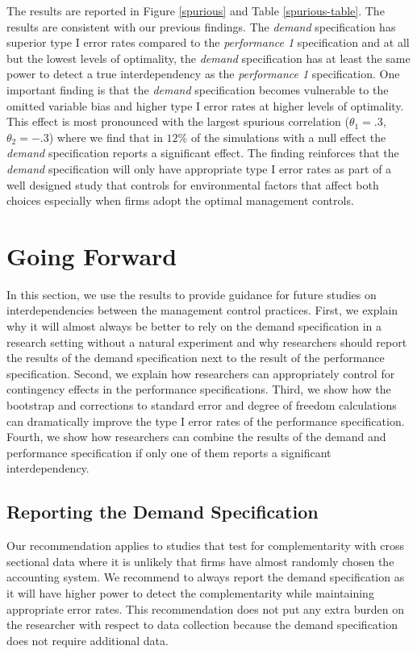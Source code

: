 \documentclass[12pt]{article}
\begin{document}
The results are reported in Figure \ref{spurious} and Table \ref{spurious-table}. The results are consistent with our previous findings. The \emph{demand} specification has superior type I error rates compared to the \emph{performance 1} specification and at all but the lowest levels of optimality, the \emph{demand} specification has at least the same power to detect a true interdependency as the \emph{performance 1} specification. One important finding is that the \emph{demand} specification becomes vulnerable to the omitted variable bias and higher type I error rates at higher levels of optimality. This effect is most pronounced with the largest spurious correlation (\(\theta_1 = .3\), \(\theta_2 = -.3\)) where we find that in $12\%$ of the simulations with a null effect the \emph{demand} specification reports a significant effect. The finding reinforces that the \emph{demand} specification will only have appropriate type I error rates as part of a well designed study that controls for environmental factors that affect both choices especially when firms adopt the optimal management controls.

\section{Going Forward}

In this section, we use the results to provide guidance for future studies on interdependencies between the management control practices. First, we explain why it will almost always be better to rely on the demand specification in a research setting without a natural experiment and why researchers should report the results of the demand specification next to the result of the performance specification. Second, we explain how researchers can appropriately control for contingency effects in the performance specifications. Third, we show how the bootstrap and corrections to standard error and degree of freedom calculations can dramatically improve the type I error rates of the performance specification. Fourth, we show how researchers can combine the results of the demand and performance specification if only one of them reports a significant interdependency.

\subsection{Reporting the Demand Specification}

Our recommendation applies to studies that test for complementarity with cross sectional data where it is unlikely that firms have almost randomly chosen the accounting system. We recommend to always report the demand specification as it will have higher power to detect the complementarity while maintaining appropriate error rates. This recommendation does not put any extra burden on the researcher with respect to data collection because the demand specification does not require additional data.
\end{document}
